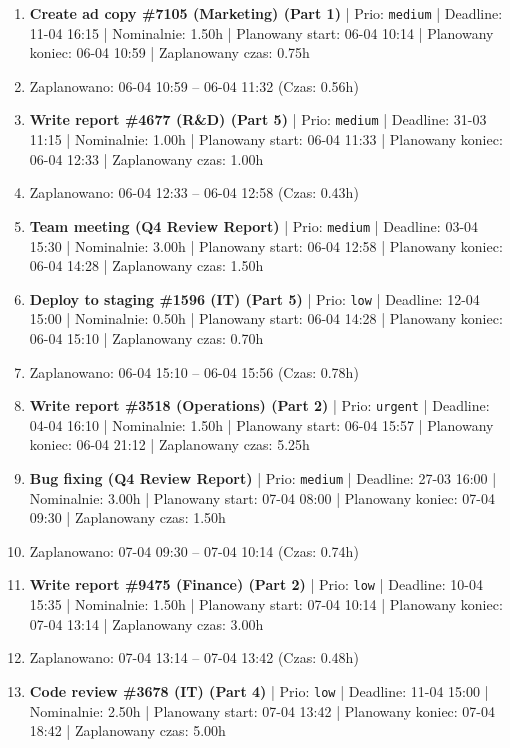 {\begin{enumerate}
  \item [\textbf{14650}] \textbf{Create ad copy \#7105 (Marketing) (Part 1)} | Prio: \texttt{medium} | Deadline: 11-04 16:15 | Nominalnie: 1.50h | Planowany start: 06-04 10:14 | Planowany koniec: 06-04 10:59 | Zaplanowany czas: 0.75h
  \item [\textbf{PRZERWA}] Zaplanowano: 06-04 10:59 -- 06-04 11:32 (Czas: 0.56h)
  \item [\textbf{14640}] \textbf{Write report \#4677 (R\&D) (Part 5)} | Prio: \texttt{medium} | Deadline: 31-03 11:15 | Nominalnie: 1.00h | Planowany start: 06-04 11:33 | Planowany koniec: 06-04 12:33 | Zaplanowany czas: 1.00h
  \item [\textbf{PRZERWA}] Zaplanowano: 06-04 12:33 -- 06-04 12:58 (Czas: 0.43h)
  \item [\textbf{14635}] \textbf{Team meeting (Q4 Review Report)} | Prio: \texttt{medium} | Deadline: 03-04 15:30 | Nominalnie: 3.00h | Planowany start: 06-04 12:58 | Planowany koniec: 06-04 14:28 | Zaplanowany czas: 1.50h
  \item [\textbf{14692}] \textbf{Deploy to staging \#1596 (IT) (Part 5)} | Prio: \texttt{low} | Deadline: 12-04 15:00 | Nominalnie: 0.50h | Planowany start: 06-04 14:28 | Planowany koniec: 06-04 15:10 | Zaplanowany czas: 0.70h
  \item [\textbf{PRZERWA}] Zaplanowano: 06-04 15:10 -- 06-04 15:56 (Czas: 0.78h)
  \item [\textbf{14598}] \textbf{Write report \#3518 (Operations) (Part 2)} | Prio: \texttt{urgent} | Deadline: 04-04 16:10 | Nominalnie: 1.50h | Planowany start: 06-04 15:57 | Planowany koniec: 06-04 21:12 | Zaplanowany czas: 5.25h
  \item [\textbf{14647}] \textbf{Bug fixing (Q4 Review Report)} | Prio: \texttt{medium} | Deadline: 27-03 16:00 | Nominalnie: 3.00h | Planowany start: 07-04 08:00 | Planowany koniec: 07-04 09:30 | Zaplanowany czas: 1.50h
  \item [\textbf{PRZERWA}] Zaplanowano: 07-04 09:30 -- 07-04 10:14 (Czas: 0.74h)
  \item [\textbf{14685}] \textbf{Write report \#9475 (Finance) (Part 2)} | Prio: \texttt{low} | Deadline: 10-04 15:35 | Nominalnie: 1.50h | Planowany start: 07-04 10:14 | Planowany koniec: 07-04 13:14 | Zaplanowany czas: 3.00h
  \item [\textbf{PRZERWA}] Zaplanowano: 07-04 13:14 -- 07-04 13:42 (Czas: 0.48h)
  \item [\textbf{14699}] \textbf{Code review \#3678 (IT) (Part 4)} | Prio: \texttt{low} | Deadline: 11-04 15:00 | Nominalnie: 2.50h | Planowany start: 07-04 13:42 | Planowany koniec: 07-04 18:42 | Zaplanowany czas: 5.00h

\end{enumerate}}
